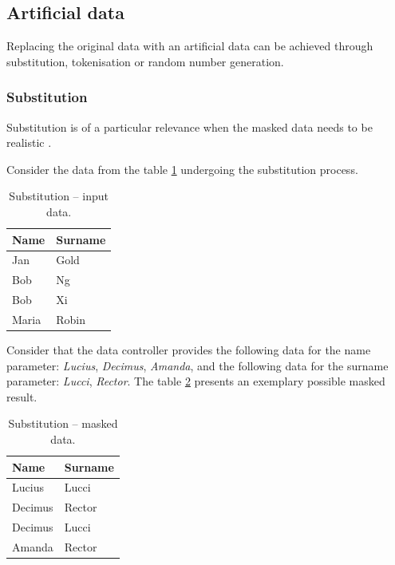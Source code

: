 \documentclass[a4paper,twoside,12pt]{book}
\begin{document}
\subsection{Artificial data}

Replacing the original data with an artificial data can be achieved through substitution, tokenisation or random number generation.


\subsubsection{Substitution}

Substitution is of a particular relevance when the masked data needs to be realistic \cite{bib:anonymization_planning}.

Consider the data from the table \ref{id:tab:substitution_raw} undergoing the substitution process.

\begin{table}[h]
\centering
\caption{Substitution – input data.}
\label{id:tab:substitution_raw}
\begin{tabular}{ll}
\toprule
Name   & Surname  \\ \midrule
Jan    & Gold     \\
Bob    & Ng       \\
Bob    & Xi       \\ 
Maria  & Robin    \\ \bottomrule
\end{tabular}
\end{table}

Consider that the data controller provides the following data for the name parameter: \textit{Lucius}, \textit{Decimus}, \textit {Amanda}, and the following data for the surname parameter: \textit{Lucci}, \textit{Rector}. The table \ref{id:tab:substitution_masked} presents an exemplary possible masked result.

\begin{table}[h]
\centering
\caption{Substitution – masked data.}
\label{id:tab:substitution_masked}
\begin{tabular}{ll}
\toprule
Name    & Surname   \\ \midrule
Lucius  & Lucci     \\
Decimus & Rector    \\
Decimus & Lucci     \\ 
Amanda  & Rector    \\ \bottomrule
\end{tabular}
\end{table}
\end{document}
